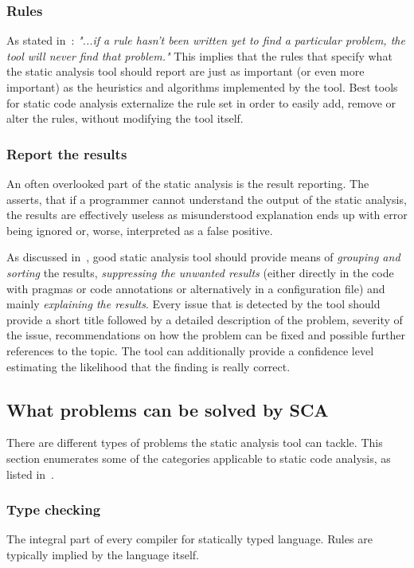 \documentclass[
  digital, %
  table,   %
  lof,     %
  lot,     %
  oneside,
]{fithesis3}
\begin{document}
\subsubsection{Rules}
As stated in~\cite{sca-for-security}: \textit{"...if a rule hasn’t been written yet to find a particular problem, the tool will never find that problem."} This implies that the rules that specify what the static analysis tool should report are just as important (or even more important) as the heuristics and algorithms implemented by the tool. Best tools for static code analysis externalize the rule set in order to easily add, remove or alter the rules, without modifying the tool itself.

\subsubsection{Report the results}
An often overlooked part of the static analysis is the result reporting. The~\cite{coverity-sca} asserts, that if a programmer cannot understand the output of the static analysis, the results are effectively useless as misunderstood explanation ends up with error being ignored or, worse, interpreted as a false positive.

As discussed in~\cite{security-programming-sca}, good static analysis tool should provide means of \textit{grouping and sorting} the results, \textit{suppressing the unwanted results} (either directly in the code with pragmas or code annotations or alternatively in a configuration file) and mainly \textit{explaining the results}. Every issue that is detected by the tool should provide a short title followed by a detailed description of the problem, severity of the issue, recommendations on how the problem can be fixed and possible further references to the topic. The tool can additionally provide a confidence level estimating the likelihood that the finding is really correct.

\subsection{What problems can be solved by SCA}
There are different types of problems the static analysis tool can tackle. This section enumerates some of the categories applicable to static code analysis, as listed in~\cite{secure-programming-sca}.

\subsubsection{Type checking}
The integral part of every compiler for statically typed language. Rules are typically implied by the language itself.
\end{document}
